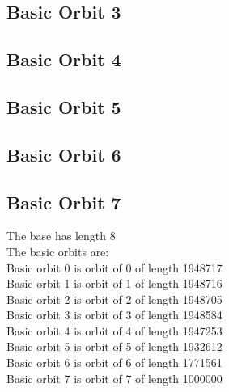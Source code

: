 {

\bigskip

\subsection*{Basic Orbit 3}



\bigskip

\subsection*{Basic Orbit 4}



\bigskip

\subsection*{Basic Orbit 5}



\bigskip

\subsection*{Basic Orbit 6}



\bigskip

\subsection*{Basic Orbit 7}



\bigskip
The base has length 8\\
The basic orbits are: \\
Basic orbit 0 is orbit of 0 of length 1948717\\
Basic orbit 1 is orbit of 1 of length 1948716\\
Basic orbit 2 is orbit of 2 of length 1948705\\
Basic orbit 3 is orbit of 3 of length 1948584\\
Basic orbit 4 is orbit of 4 of length 1947253\\
Basic orbit 5 is orbit of 5 of length 1932612\\
Basic orbit 6 is orbit of 6 of length 1771561\\
Basic orbit 7 is orbit of 7 of length 1000000\\
}
